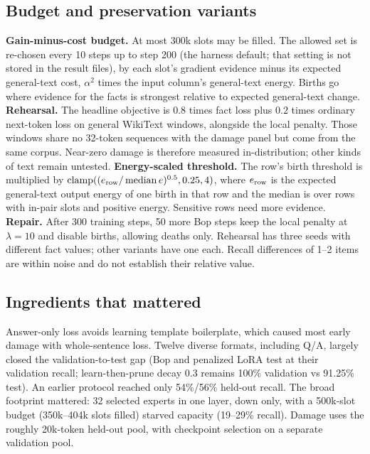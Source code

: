 \documentclass[11pt]{article}
\begin{document}
\subsection{Budget and preservation variants}
\textbf{Gain-minus-cost budget.} At most 300k slots may be filled. The allowed set
is re-chosen every 10 steps up to step 200 (the harness default; that setting is not stored in the
result files), by each slot's gradient evidence minus its expected general-text cost,
$\alpha^2$ times the input column's general-text energy. Births go where evidence for the facts
is strongest relative to expected general-text change.
\textbf{Rehearsal.} The headline objective is $0.8$ times fact loss plus $0.2$ times ordinary
next-token loss on general WikiText windows, alongside the local penalty. Those windows share
no 32-token sequences with the damage panel but come from the same corpus. Near-zero damage is
therefore measured in-distribution; other kinds of text remain untested.
\textbf{Energy-scaled threshold.} The row's birth threshold is multiplied by
$\operatorname{clamp}((e_{\rm row}/\operatorname{median}e)^{0.5},0.25,4)$, where $e_{\rm row}$
is the expected general-text output energy of one birth in that row and the median is over rows with in-pair slots and positive energy. Sensitive rows need more evidence.
\textbf{Repair.} After 300 training steps, 50 more Bop steps keep the local penalty at $\lambda=10$
and disable births, allowing deaths only. Rehearsal has three seeds with different fact values; other variants have one each.
Recall differences of 1--2 items are within noise and do not establish their relative value.

\subsection{Ingredients that mattered} Answer-only loss avoids learning template boilerplate, which
caused most early damage with whole-sentence loss. Twelve diverse formats, including Q/A, largely
closed the validation-to-test gap (Bop and penalized LoRA test at their validation recall;
learn-then-prune decay 0.3 remains 100\% validation vs 91.25\% test). An earlier protocol reached
only 54\%/56\% held-out recall. The broad footprint mattered: 32 selected experts in one layer, down only, with a 500k-slot budget (350k--404k slots filled)
starved capacity (19--29\% recall). Damage uses the roughly 20k-token held-out pool, with checkpoint selection on a
separate validation pool.
\end{document}

